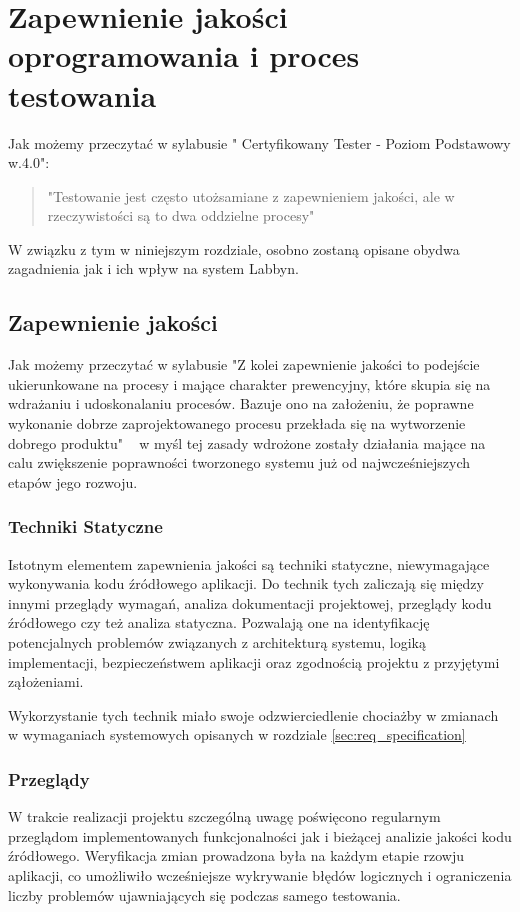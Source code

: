 \chapter{Zapewnienie jakości oprogramowania i proces testowania}
Jak możemy przeczytać w sylabusie " Certyfikowany Tester - Poziom Podstawowy w.4.0":
\begin{quote}
    "Testowanie jest często utożsamiane z zapewnieniem jakości, ale w rzeczywistości są to dwa oddzielne procesy" ~\cite{istqb_ctfl_4}
\end{quote}
W związku z tym w niniejszym rozdziale, osobno zostaną opisane obydwa zagadnienia jak i ich wpływ na system \gls{Labbyn}.

\section{Zapewnienie jakości}
\par
Jak możemy przeczytać w sylabusie "Z kolei zapewnienie jakości to podejście ukierunkowane na procesy i mające charakter prewencyjny, które skupia się na wdrażaniu i udoskonalaniu procesów. Bazuje ono na założeniu, że poprawne wykonanie dobrze zaprojektowanego procesu przekłada się na wytworzenie dobrego produktu" ~\cite{istqb_ctfl_4} w myśl tej zasady wdrożone zostały działania mające na calu zwiększenie poprawności tworzonego systemu już od najwcześniejszych etapów jego rozwoju.
\subsection{Techniki Statyczne}
\par
Istotnym elementem zapewnienia jakości są techniki statyczne, niewymagające wykonywania kodu źródłowego aplikacji. Do technik tych zaliczają się między innymi przeglądy wymagań, analiza dokumentacji projektowej, przeglądy kodu źródłowego czy też analiza statyczna.
Pozwalają one na identyfikację potencjalnych problemów związanych z architekturą systemu, logiką implementacji, bezpieczeństwem aplikacji oraz zgodnością projektu z przyjętymi ząłożeniami.
\par
Wykorzystanie tych technik miało swoje odzwierciedlenie chociażby w zmianach w wymaganiach systemowych opisanych w rozdziale \ref{sec:req_specification}
\subsection{Przeglądy}
\par
W trakcie realizacji projektu szczególną uwagę poświęcono regularnym przeglądom implementowanych funkcjonalności jak i bieżącej analizie jakości kodu źródłowego.
Weryfikacja zmian prowadzona była na każdym etapie rzowju aplikacji, co umożliwiło wcześniejsze wykrywanie błędów logicznych i ograniczenia liczby problemów ujawniających się podczas samego testowania.
